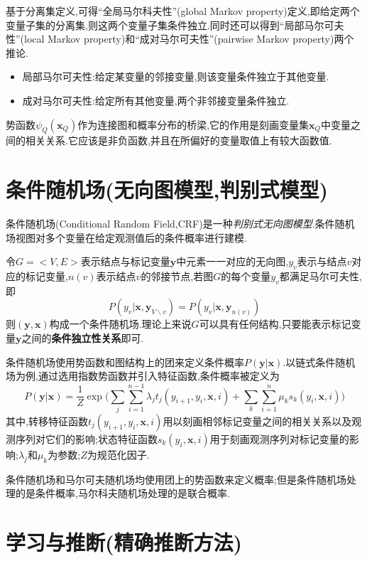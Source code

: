 基于分离集定义,可得``全局马尔科夫性''(global Markov property)定义,即给定两个变量子集的分离集,则这两个变量子集条件独立.同时还可以得到``局部马尔可夫性''(local Markov property)和``成对马尔可夫性''(pairwise Markov property)两个推论.

\begin{itemize}
\item 局部马尔可夫性:给定某变量的邻接变量,则该变量条件独立于其他变量.
\item 成对马尔可夫性:给定所有其他变量,两个非邻接变量条件独立.
\end{itemize}

势函数$\psi_Q(\bm x_Q)$作为连接图和概率分布的桥梁,它的作用是刻画变量集$\bm x_Q$中变量之间的相关关系.它应该是非负函数,并且在所偏好的变量取值上有较大函数值.

\section{条件随机场(无向图模型,判别式模型)}

条件随机场(Conditional Random Field,CRF)是一种\textit{判别式无向图模型}.条件随机场视图对多个变量在给定观测值后的条件概率进行建模.

令$G=<V,E>$表示结点与标记变量$\bm y$中元素一一对应的无向图,$y_v$表示与结点$v$对应的标记变量,$n(v)$表示结点$v$的邻接节点,若图$G$的每个变量$y_v$都满足马尔可夫性,即
\begin{equation}
P(y_v|\bm x,\bm y_{V\backslash v})=P(y_v|\bm x,\bm y_{n(v)})
\end{equation}
则$(\bm y, \bm x)$构成一个条件随机场.理论上来说$G$可以具有任何结构,只要能表示标记变量$\bm y$之间的\textbf{条件独立性关系}即可.

条件随机场使用势函数和图结构上的团来定义条件概率$P(\bm y|\bm x)$.以链式条件随机场为例,通过选用指数势函数并引入特征函数,条件概率被定义为
\begin{equation}
P(\bm y|\bm x)=\frac{1}{Z}\exp\Big(\sum_j\sum_{i=1}^{n-1}\lambda_jt_j(y_{i+1},y_i,\bm x, i)+\sum_k\sum_{i=1}^n\mu_ks_k(y_i,\bm x,i)\Big)
\end{equation}
其中,转移特征函数$t_j(y_{i+1},y_i,\bm x, i)$用以刻画相邻标记变量之间的相关关系以及观测序列对它们的影响;状态特征函数$s_k(y_i,\bm x,i)$用于刻画观测序列对标记变量的影响;$\lambda_j$和$\mu_k$为参数;$Z$为规范化因子.

条件随机场和马尔可夫随机场均使用团上的势函数来定义概率;但是条件随机场处理的是条件概率,马尔科夫随机场处理的是联合概率.

\section{学习与推断(精确推断方法)}

